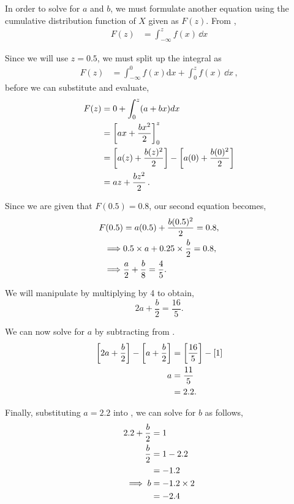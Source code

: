 \begin{subquestions}
\begin{subsubquestions}
In order to solve for $a$ and $b$, we must formulate another equation using the cumulative distribution function of $X$ given as $F(z)$. From , 
\begin{align}
	F(z) & = \int_{-\infty}^{z} f(x)\,\dd x
\end{align}

Since we will use $z = 0.5$, we must split up the integral as
\begin{align}
	F(z) & = \int_{-\infty}^{0} f(x)\mathrm{d}x + \int_{0}^{z} f(x)\,\dd x \,,
\end{align}
before we can substitute and evaluate,
\begin{align}
	F(z) & = 0 + \int_{0}^{z} (a+bx)dx \nonumber \\
	     & = \left[ax + \frac{bx^2}{2}\right]_0^z \nonumber \\
	     & = \left[a(z) + \frac{b(z)^2}{2}\right] - \left[a(0) + \frac{b(0)^2}{2}\right] \nonumber \\
	     & = az + \frac{bz^2}{2} \,.
\end{align}

Since we are given that $F(0.5)=0.8$, our second equation becomes,
\begin{align}
	F(0.5) & = a(0.5) + \frac{b(0.5)^2}{2} = 0.8, \nonumber \\
  \implies &  0.5 \times a + 0.25 \times \frac{b}{2} = 0.8, \nonumber \\
  \implies & \frac{a}{2} + \frac{b}{8} = \frac{4}{5}. \label{2015:q4:eqn:crv2}
\end{align}

We will manipulate  by multiplying by 4 to obtain,
\begin{equation}
	2a + \frac{b}{2} = \frac{16}{5}. \label{2015:q4:eqn:crv3}
\end{equation}

We can now solve for $a$ by subtracting  from .
\begin{align}
	\left[2a + \frac{b}{2} \right] - \left[a + \frac{b}{2} \right] & = \left[\frac{16}{5} \right] - [1] \nonumber \\
	a & = \frac{11}{5} \nonumber \\
	  & = 2.2.
\end{align}

Finally, substituting $a=2.2$ into , we can solve for $b$ as follows,
\begin{align}
	2.2 + \frac{b}{2} & = 1 \nonumber \\
	\frac{b}{2} & = 1 - 2.2 \nonumber \\
	            & = -1.2 \nonumber \\
	\implies  b & = -1.2 \times 2 \nonumber \\
	            & = -2.4
\end{align}


\end{subsubquestions}
\end{subquestions}
